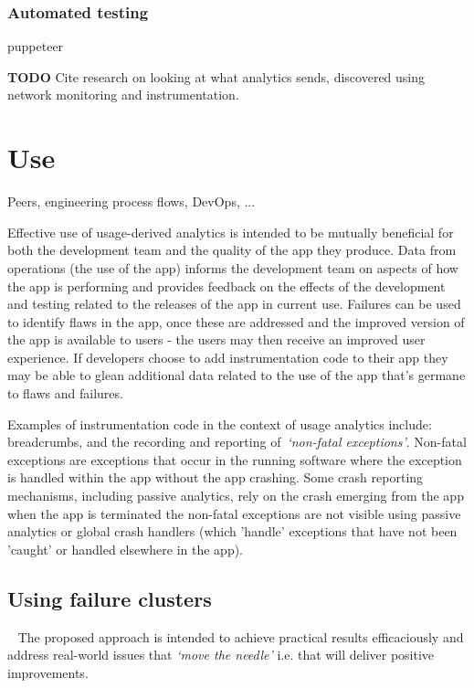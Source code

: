 \subsubsection{Automated testing}
puppeteer~\cite{using_puppeteer_to_automate_your_google_analytics_testing}

\textbf{TODO} Cite research on looking at what analytics sends, discovered using network monitoring and instrumentation. 





\section{Use}
Peers, engineering process flows, DevOps, ...

Effective use of usage-derived analytics is intended to be mutually beneficial for both the development team and the quality of the app they produce. Data from operations (the use of the app) informs the development team on aspects of how the app is performing and provides feedback on the effects of the development and testing related to the releases of the app in current use. Failures can be used to identify flaws in the app, once these are addressed and the improved version of the app is available to users - the users may then receive an improved user experience. If developers choose to add instrumentation code to their app they may be able to glean additional data related to the use of the app that's germane to flaws and failures.

Examples of instrumentation code in the context of usage analytics include: breadcrumbs, and the recording and reporting of~\emph{`non-fatal exceptions'}. Non-fatal exceptions are exceptions that occur in the running software where the exception is handled within the app without the app crashing. Some crash reporting mechanisms, including passive analytics, rely on the crash emerging from the app when the app is terminated the non-fatal exceptions are not visible using passive analytics or global crash handlers (which 'handle' exceptions that have not been 'caught' or handled elsewhere in the app).



\subsection{Using failure clusters}~\label{section-select-aggregate-scope-analyse-triage-and-prioritise}
The proposed approach is intended to achieve practical results efficaciously and address real-world issues that \emph{`move the needle'} i.e. that will deliver positive improvements. 

